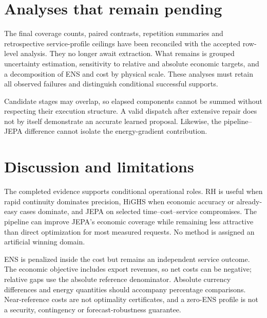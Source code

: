\section{Analyses that remain pending}
The final coverage counts, paired contrasts, repetition summaries and
retrospective service-profile ceilings have been reconciled with the accepted
row-level analysis. They no longer await extraction. What remains is grouped
uncertainty estimation, sensitivity to relative and absolute economic targets,
and a decomposition of ENS and cost by physical scale. These analyses must
retain all observed failures and distinguish conditional successful supports.

Candidate stages may overlap, so elapsed components cannot be summed without
respecting their execution structure. A valid dispatch after extensive repair
does not by itself demonstrate an accurate learned proposal. Likewise, the
pipeline--JEPA difference cannot isolate the energy-gradient contribution.


\section{Discussion and limitations}
The completed evidence supports conditional operational roles. RH is useful
when rapid continuity dominates precision, HiGHS when economic accuracy or
already-easy cases dominate, and JEPA on selected time--cost--service
compromises. The pipeline can improve JEPA's economic coverage while remaining
less attractive than direct optimization for most measured requests. No method
is assigned an artificial winning domain.

ENS is penalized inside the cost but remains an independent service outcome.
The economic objective includes export revenues, so net costs can be negative;
relative gaps use the absolute reference denominator. Absolute currency
differences and energy quantities should accompany percentage comparisons.
Near-reference costs are not optimality certificates, and a zero-ENS profile
is not a security, contingency or forecast-robustness guarantee.

